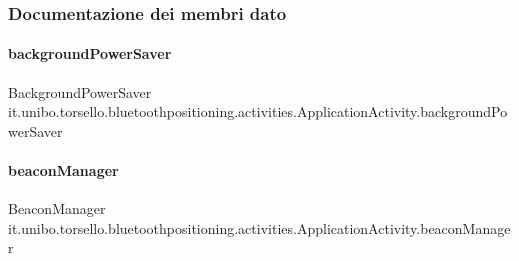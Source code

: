 \subsubsection{Documentazione dei membri dato}
\hypertarget{classit_1_1unibo_1_1torsello_1_1bluetoothpositioning_1_1activities_1_1ApplicationActivity_a85885639575161f4d73d4fc788f44ace_a85885639575161f4d73d4fc788f44ace}{}\label{classit_1_1unibo_1_1torsello_1_1bluetoothpositioning_1_1activities_1_1ApplicationActivity_a85885639575161f4d73d4fc788f44ace_a85885639575161f4d73d4fc788f44ace} 
\paragraph{\texorpdfstring{background\+Power\+Saver}{backgroundPowerSaver}}
{\footnotesize\ttfamily Background\+Power\+Saver it.\+unibo.\+torsello.\+bluetoothpositioning.\+activities.\+Application\+Activity.\+background\+Power\+Saver\hspace{0.3cm}{\ttfamily [private]}}

\hypertarget{classit_1_1unibo_1_1torsello_1_1bluetoothpositioning_1_1activities_1_1ApplicationActivity_a973c37226a3dbba6016966c3555aff65_a973c37226a3dbba6016966c3555aff65}{}\label{classit_1_1unibo_1_1torsello_1_1bluetoothpositioning_1_1activities_1_1ApplicationActivity_a973c37226a3dbba6016966c3555aff65_a973c37226a3dbba6016966c3555aff65} 
\paragraph{\texorpdfstring{beacon\+Manager}{beaconManager}}
{\footnotesize\ttfamily Beacon\+Manager it.\+unibo.\+torsello.\+bluetoothpositioning.\+activities.\+Application\+Activity.\+beacon\+Manager\hspace{0.3cm}{\ttfamily [private]}}

